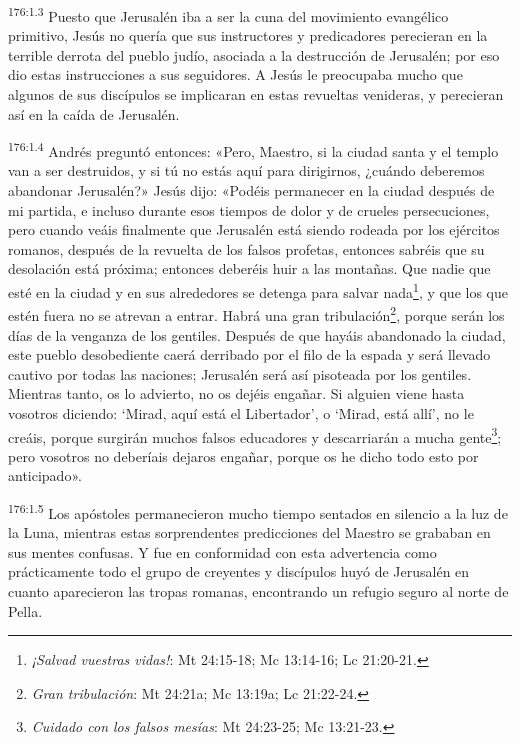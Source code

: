 \par 
\textsuperscript{176:1.3} Puesto que Jerusalén iba a ser la cuna del movimiento evangélico primitivo, Jesús no quería que sus instructores y predicadores perecieran en la terrible derrota del pueblo judío, asociada a la destrucción de Jerusalén; por eso dio estas instrucciones a sus seguidores. A Jesús le preocupaba mucho que algunos de sus discípulos se implicaran en estas revueltas venideras, y perecieran así en la caída de Jerusalén.

\par 
\textsuperscript{176:1.4} Andrés preguntó entonces: «Pero, Maestro, si la ciudad santa y el templo van a ser destruidos, y si tú no estás aquí para dirigirnos, ¿cuándo deberemos abandonar Jerusalén?» Jesús dijo: «Podéis permanecer en la ciudad después de mi partida, e incluso durante esos tiempos de dolor y de crueles persecuciones, pero cuando veáis finalmente que Jerusalén está siendo rodeada por los ejércitos romanos, después de la revuelta de los falsos profetas, entonces sabréis que su desolación está próxima; entonces deberéis huir a las montañas. Que nadie que esté en la ciudad y en sus alrededores se detenga para salvar nada\footnote{\textit{¡Salvad vuestras vidas!}: Mt 24:15-18; Mc 13:14-16; Lc 21:20-21.}, y que los que estén fuera no se atrevan a entrar. Habrá una gran tribulación\footnote{\textit{Gran tribulación}: Mt 24:21a; Mc 13:19a; Lc 21:22-24.}, porque serán los días de la venganza de los gentiles. Después de que hayáis abandonado la ciudad, este pueblo desobediente caerá derribado por el filo de la espada y será llevado cautivo por todas las naciones; Jerusalén será así pisoteada por los gentiles. Mientras tanto, os lo advierto, no os dejéis engañar. Si alguien viene hasta vosotros diciendo: `Mirad, aquí está el Libertador', o `Mirad, está allí', no le creáis, porque surgirán muchos falsos educadores y descarriarán a mucha gente\footnote{\textit{Cuidado con los falsos mesías}: Mt 24:23-25; Mc 13:21-23.}; pero vosotros no deberíais dejaros engañar, porque os he dicho todo esto por anticipado».

\par 
\textsuperscript{176:1.5} Los apóstoles permanecieron mucho tiempo sentados en silencio a la luz de la Luna, mientras estas sorprendentes predicciones del Maestro se grababan en sus mentes confusas. Y fue en conformidad con esta advertencia como prácticamente todo el grupo de creyentes y discípulos huyó de Jerusalén en cuanto aparecieron las tropas romanas, encontrando un refugio seguro al norte de Pella.


